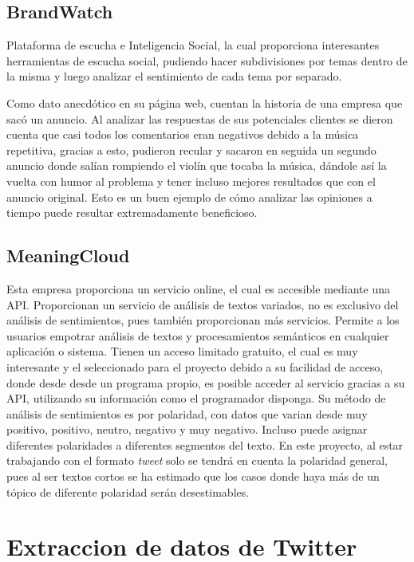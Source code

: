 \subsection{BrandWatch}
Plataforma de escucha e Inteligencia Social, la cual proporciona interesantes herramientas de escucha social, pudiendo hacer subdivisiones por temas dentro de la misma y luego analizar el sentimiento de cada tema por separado. 

Como dato anecdótico en su página web, cuentan la historia de una empresa que sacó un anuncio. Al analizar las respuestas de sus potenciales clientes se dieron cuenta que casi todos los comentarios eran negativos debido a la música repetitiva, gracias a esto, pudieron recular y sacaron en seguida un segundo anuncio donde salían rompiendo el violín que tocaba la música, dándole así la vuelta con humor al problema y tener incluso mejores resultados que con el anuncio original. Esto es un buen ejemplo de cómo analizar las opiniones a tiempo puede resultar extremadamente beneficioso.

\subsection{MeaningCloud}
Esta empresa proporciona un servicio online, el cual es accesible mediante una API. Proporcionan un servicio de análisis de textos variados, no es exclusivo del análisis de sentimientos, pues también proporcionan más servicios. Permite a los usuarios empotrar análisis de textos y procesamientos semánticos en cualquier aplicación o sistema. Tienen un acceso limitado gratuito, el cual es muy interesante y el seleccionado para el proyecto debido a su facilidad de acceso, donde desde desde un programa propio, es posible acceder al servicio gracias a su API, utilizando su información como el programador disponga. Su método de análisis de sentimientos es por polaridad, con datos que varian desde muy positivo, positivo, neutro, negativo y muy negativo. Incluso puede asignar diferentes polaridades a diferentes segmentos del texto. En este proyecto, al estar trabajando con el formato \textit{tweet} solo se tendrá en cuenta la polaridad general, pues al ser textos cortos se ha estimado que los casos donde haya más de un tópico de diferente polaridad serán desestimables. 


\section{Extraccion de datos de Twitter}


